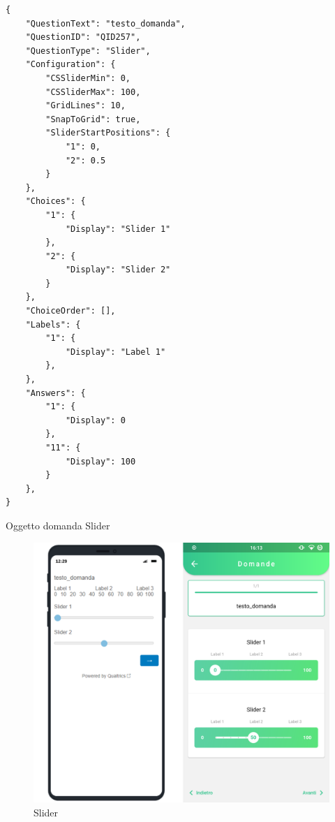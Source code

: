 \newpage
\begin{json}
\begin{verbatim}
{
    "QuestionText": "testo_domanda",
    "QuestionID": "QID257",
    "QuestionType": "Slider",
    "Configuration": {
        "CSSliderMin": 0,
        "CSSliderMax": 100,
        "GridLines": 10,
        "SnapToGrid": true,
        "SliderStartPositions": {
            "1": 0,
            "2": 0.5
        }
    },
    "Choices": {
        "1": {
            "Display": "Slider 1"
        },
        "2": {
            "Display": "Slider 2"
        }
    },
    "ChoiceOrder": [],
    "Labels": {
        "1": {
            "Display": "Label 1"
        },
    },
    "Answers": {
        "1": {
            "Display": 0
        },
        "11": {
            "Display": 100
        }
    },
}
\end{verbatim}
\caption{Oggetto domanda Slider}
\label{json:sbs}
\end{json}

\begin{figure}[h!]
\centering
\includegraphics[width=\textwidth]{img/slider}
\caption{Slider}
\label{fig:slider}
\end{figure}

\clearpage
